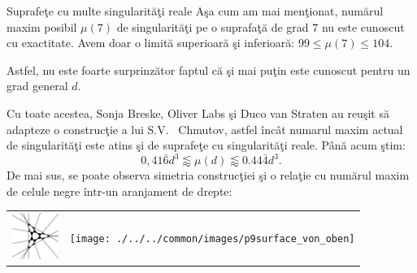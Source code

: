 \begin{surferPage}[216-singularit\u{a}\c{t}i]{Suprafe\c{t}e cu multe singularit\u{a}\c{t}i reale}
   A\c{s}a cum am mai men\c{t}ionat, num\u{a}rul maxim posibil $\mu(7)$ de singularit\u{a}\c{t}i pe o suprafa\c{t}\u{a} de grad $7$ nu este
    cunoscut cu exactitate. Avem doar o limit\u{a} superioar\u{a} \c{s}i inferioar\u{a}: $99 \le \mu(7) \le 104$.

    Astfel, nu este foarte surprinz\u{a}tor faptul c\u{a} \c{s}i mai pu\c{t}in este cunoscut pentru un grad general $d$.
    
    Cu toate acestea, Sonja Breske, Oliver Labs \c{s}i Duco van Straten au reu\c{s}it s\u{a} adapteze o
    construc\c{t}ie a lui S.V. \ Chmutov, astfel \^{i}nc\^{a}t numarul maxim actual de singularit\u{a}\c{t}i este atins \c{s}i de suprafe\c{t}e cu singularit\u{a}\c{t}i 
    reale.
    P\^{a}n\u{a} acum \c{s}tim:
    \[0,41\bar{6}d^3 \lessapprox \mu(d) \lessapprox 0.44\bar{4} d^3.\]
    De mai sus, se poate observa simetria construc\c{t}iei \c{s}i o rela\c{t}ie cu num\u{a}rul maxim de celule negre \^{i}ntr-un aranjament de drepte:
    \begin{center}
      \begin{tabular}{c@{\qquad}c}
        \includegraphics[height=1.5cm]{./../../common/images/vielesing.pdf}
        &
        \texttt{[image: ./../../common/images/p9surface\_von\_oben]}
      \end{tabular}
    \end{center}
\end{surferPage}
